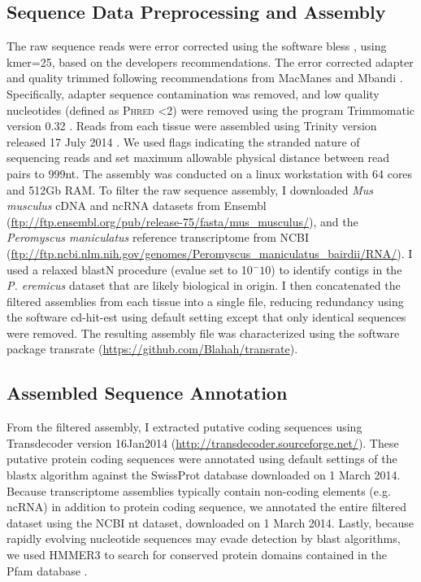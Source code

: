 \documentclass[11pt]{article}
\begin{document}
\subsection*{Sequence Data Preprocessing and Assembly}

The raw sequence reads were error corrected using the software bless \cite{Heo:2014cb}, using kmer=25, based on the developers recommendations. The error corrected adapter and quality trimmed following recommendations from MacManes \cite{MacManes:2014io} and Mbandi \cite{Christoffels:2014bg}. Specifically, adapter sequence contamination was removed, and low quality nucleotides (defined as \textsc{Phred} \textless 2) were removed using the program Trimmomatic version 0.32  \cite{Lohse:2012fg}. Reads from each tissue were assembled using Trinity version released 17 July 2014 \cite{Haas:2013jq}. We used flags indicating the stranded nature of sequencing reads and set maximum allowable physical distance between read pairs to 999nt. The assembly was conducted on a linux workstation with 64 cores and 512Gb RAM. To filter the raw sequence assembly, I downloaded \textit{Mus musculus} cDNA and ncRNA datasets from Ensembl (\url{ftp://ftp.ensembl.org/pub/release-75/fasta/mus_musculus/}), and the \textit{Peromyscus maniculatus} reference transcriptome from NCBI (\url{ftp://ftp.ncbi.nlm.nih.gov/genomes/Peromyscus_maniculatus_bairdii/RNA/}). I used a relaxed blastN procedure (evalue set to 10$^-10$) to identify contigs in the \textit{P. eremicus} dataset that are likely biological in origin. I then concatenated the filtered assemblies from each tissue into a single file, reducing redundancy using the software cd-hit-est \cite{Li:2006hr} using default setting except that only identical sequences were removed. The resulting assembly file was characterized using the software package transrate (\url{https://github.com/Blahah/transrate}). \\

\subsection*{Assembled Sequence Annotation}

From the filtered assembly, I extracted putative coding sequences using Transdecoder version 16Jan2014 (\url{http://transdecoder.sourceforge.net/}). These putative protein coding sequences were annotated using default settings of the blastx algorithm \cite{Camacho:2009fc} against the SwissProt database downloaded on 1 March 2014. Because transcriptome assemblies typically contain non-coding elements (e.g. ncRNA) in addition to protein coding sequence, we annotated the entire filtered dataset using the NCBI nt dataset, downloaded on 1 March 2014. Lastly, because rapidly evolving nucleotide sequences may evade detection by blast algorithms, we used HMMER3 \cite{Wheeler:2013gj} to search for conserved protein domains contained in the Pfam database \cite{Punta:2012ko}. \\
\end{document}
